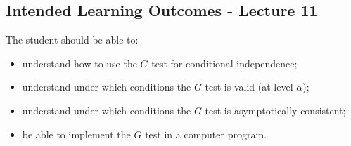 \subsection*{Intended Learning Outcomes - Lecture 11}

The student should be able to:
\begin{itemize}
\item understand how to use the $G$ test for conditional independence;
\item understand under which conditions the $G$ test is valid (at level $\alpha$);
\item understand under which conditions the $G$ test is asymptotically consistent;
\item be able to implement the $G$ test in a computer program.
\end{itemize}
